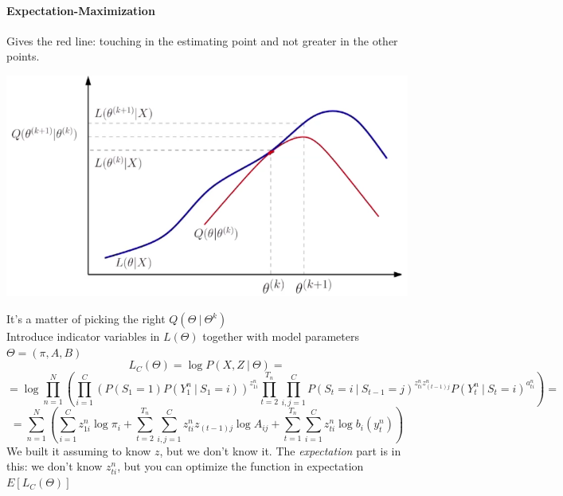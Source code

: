 \documentclass[10pt]{report}
\begin{document}
\paragraph{Expectation-Maximization} Gives the red line: touching in the estimating point and not greater in the other points.
\begin{center}
	\includegraphics[scale=0.5]{30.png}
\end{center}
It's a matter of picking the right $Q(\Theta\:|\:\Theta^k)$\\
Introduce indicator variables in $L(\Theta)$ together with model parameters $\Theta = (\pi,A,B)$
$$L_C(\Theta)=\log P(X,Z\:|\:\Theta) = $$
$$ = \log\prod_{n=1}^N\left(\prod_{i=1}^C \left(P(S_1=1)P(Y_1^n\:|\:S_1=i) \right)^{z_{1i}^n} \prod_{t=2}^{T_n}\prod_{i,j=1}^C P(S_t=i\:|\:S_{t-1}=j)^{z_{ti}^nz_{(t-1)j}^n} P(Y_t^n\:|\:S_t=i)^{a_{ti}^n} \right) =$$
$$ = \sum_{n=1}^N\left( \sum_{i=1}^C z_{1i}^n\log\pi_i+\sum_{t=2}^{T_n}\sum_{i,j=1}^C z_{ti}^nz_{(t-1)j}\log A_{ij} + \sum_{t=1}^{T_n}\sum_{i=1}^C z_{ti}^n\log b_i(y_t^n) \right)$$
We built it assuming to know $z$, but we don't know it. The \textit{expectation} part is in this: we don't know $z_{ti}^n$, but you can optimize the function in expectation $E[L_C(\Theta)]$
\pagebreak
\end{document}
